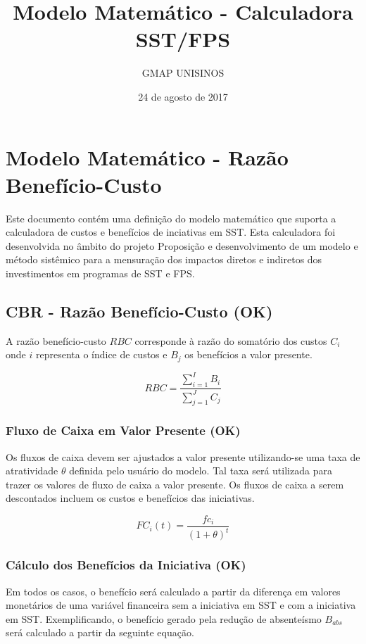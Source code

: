\documentclass[]{article}
\title{Modelo Matemático - Calculadora SST/FPS}
\author{GMAP \textbar{} UNISINOS}
\date{24 de agosto de 2017}
\begin{document}
\maketitle

{
\setcounter{tocdepth}{6}
\tableofcontents
}
\section{Modelo Matemático - Razão
Benefício-Custo}\label{modelo-matematico---razao-beneficio-custo}

Este documento contém uma definição do modelo matemático que suporta a
calculadora de custos e benefícios de inciativas em SST. Esta
calculadora foi desenvolvida no âmbito do projeto Proposição e
desenvolvimento de um modelo e método sistêmico para a mensuração dos
impactos diretos e indiretos dos investimentos em programas de SST e
FPS.

\subsection{CBR - Razão Benefício-Custo
(OK)}\label{cbr---razao-beneficio-custo-ok}

A razão benefício-custo \({RBC}\) corresponde à razão do somatório dos
custos \(C_i\) onde \(i\) representa o índice de custos e \(B_j\) os
benefícios a valor presente.

\[{RBC} = \frac{\sum_{i=1}^{I} B_{i}} {\sum_{j=1}^{J} C_{j}}\]

\subsubsection{Fluxo de Caixa em Valor Presente
(OK)}\label{fluxo-de-caixa-em-valor-presente-ok}

Os fluxos de caixa devem ser ajustados a valor presente utilizando-se
uma taxa de atratividade \(\theta\) definida pelo usuário do modelo. Tal
taxa será utilizada para trazer os valores de fluxo de caixa a valor
presente. Os fluxos de caixa a serem descontados incluem os custos e
benefícios das iniciativas.

\[FC_i(t) = \frac{fc_i}{(1+\theta)^t}\]

\subsubsection{Cálculo dos Benefícios da Iniciativa
(OK)}\label{calculo-dos-beneficios-da-iniciativa-ok}

Em todos os casos, o benefício será calculado a partir da diferença em
valores monetários de uma variável financeira sem a iniciativa em SST e
com a iniciativa em SST. Exemplificando, o benefício gerado pela redução
de absenteísmo \(B_{abs}\) será calculado a partir da seguinte equação.
\end{document}
